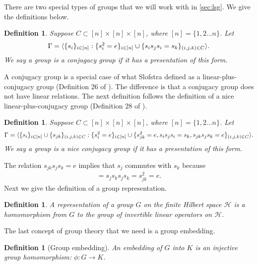 \documentclass[11pt,letterpaper]{article}
\DeclarePairedDelimiter{\ip}{\langle}{\rangle}
\newcommand{\calH}{\mathcal{H}}
\newcommand{\1}{\mathbb{1}}
\newtheorem{definition}[theorem]{Definition}
\theoremstyle{definition}
\begin{document}
There are two special types of groups that we will work with in \cref{sec:lsg}. We give the definitions below.
\begin{definition}
    \label{def:spe_conj_grp}
    Suppose $C \subset [n] \times [n] \times [n]$, where $[n] = \{1,2 \dots n\}$. 
    Let
    \begin{align*}
        \Gamma = \ip{\{s_i\}_{i \in [n]}  :
        \{s_i^2=e\}_{i\in [n]} \cup 
        \{ s_i s_j s_i = s_k\}_{(i,j,k)\in C}}.
    \end{align*}
    We say a group is a conjugacy group if it has a presentation of this form. 
\end{definition}
A conjugacy group is a special case of what Slofstra defined as 
a linear-plus-conjugacy group (Definition $26$ of \cite{slofstra2017}). 
The difference is that a conjugacy group does not have linear relations. 
The next definition follows the 
definition of a nice linear-plus-conjugacy group (Definition $28$ of \cite{slofstra2017}).
\begin{definition}
    \label{def:nice_conj_grp}
    Suppose $C \subset [n] \times [n] \times [n]$, where $[n] = \{1,2 \dots n\}$. 
    Let 
    \begin{align*}
        \Gamma = \ip{\{s_i\}_{i \in [n]} \cup \{s_{jk}\}_{(i,j,k)\in C} :
        \{s_i^2=e\}_{i\in [n]} \cup 
        \{s_{jk}^2 = e, s_is_js_i = s_k, s_{jk}s_js_k = e\}_{(i,j,k)\in C}}.
    \end{align*}
    We say a group is a nice conjugacy group if it has a presentation of this form. 
\end{definition}
The relation $s_{jk} s_js_k = e$ implies that $s_j$ commutes with $s_k$
because
\begin{align*}
    [s_j, s_k] = s_js_ks_js_k = s_{jk}^2 = e.
\end{align*}
Next we give the definition of a group representation. 
\begin{definition}
    A representation of a group $G$ on the finite Hilbert space $\calH$ is a homomorphism from $G$ to the group of invertible linear operators on $\calH$. 
\end{definition}
The last concept of group theory that we need is a group embedding.
\begin{definition}[Group embedding]
    An embedding of $G$ into $K$ is an injective group homomorphism: $\phi: G \rightarrow K$.
\end{definition}
\end{document}
